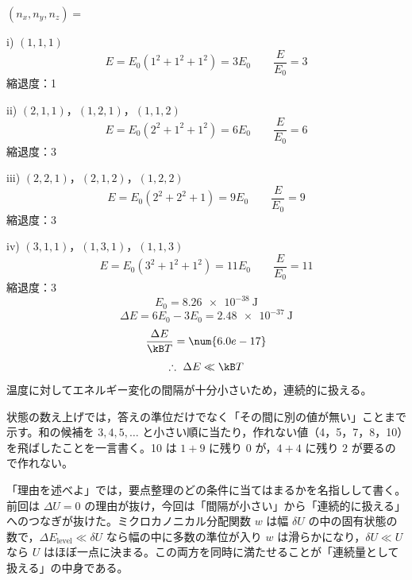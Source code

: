 $(n_{x},n_{y},n_{z})=$

i) $(1,1,1)$
\[ E=E_{0}(1^{2}+1^{2}+1^{2})=3E_{0}\qquad\frac{E}{E_{0}}=3 \]
縮退度：1

ii) $(2,1,1)$，$(1,2,1)$，$(1,1,2)$
\[ E=E_{0}(2^{2}+1^{2}+1^{2})=6E_{0}\qquad\frac{E}{E_{0}}=6 \]
縮退度：3

iii) $(2,2,1)$，$(2,1,2)$，$(1,2,2)$
\[ E=E_{0}(2^{2}+2^{2}+1)=9E_{0}\qquad\frac{E}{E_{0}}=9 \]
縮退度：3

iv) $(3,1,1)$，$(1,3,1)$，$(1,1,3)$
\[ E=E_{0}(3^{2}+1^{2}+1^{2})=11E_{0}\qquad\frac{E}{E_{0}}=11 \]
縮退度：3
\[ E_{0}=\qty{8.26e-38}{\joule} \]
\[ \Delta E=6E_{0}-3E_{0}=\qty{2.48e-37}{\joule} \]
\[ \frac{\Delta E}{\kB T}=\num{6.0e-17} \]
\[ \therefore\ \Delta E\ll\kB T \]
温度に対してエネルギー変化の間隔が十分小さいため，連続的に扱える。
\item 状態の数え上げでは，答えの準位だけでなく「その間に別の値が無い」ことまで示す。和の候補を $3,4,5,\dots$ と小さい順に当たり，作れない値（4，5，7，8，10）を飛ばしたことを一言書く。10 は $1+9$ に残り $0$ が，$4+4$ に残り $2$ が要るので作れない。
\item {} 「理由を述べよ」では，要点整理のどの条件に当てはまるかを名指しして書く。前回は $\Delta U=0$ の理由が抜け，今回は「間隔が小さい」から「連続的に扱える」へのつなぎが抜けた。ミクロカノニカル分配関数 $w$ は幅 $\delta U$ の中の固有状態の数で，$\Delta E_{\mathrm{level}}\ll\delta U$ なら幅の中に多数の準位が入り $w$ は滑らかになり，$\delta U\ll U$ なら $U$ はほぼ一点に決まる。この両方を同時に満たせることが「連続量として扱える」の中身である。
